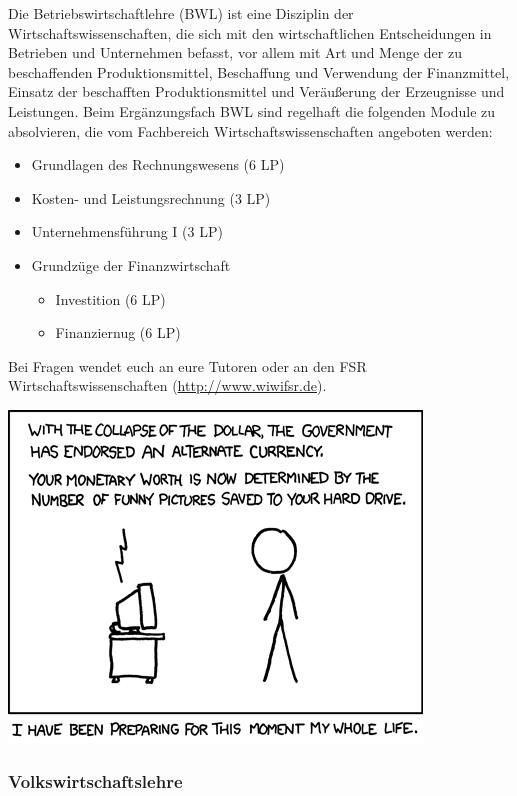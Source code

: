 Die Betriebswirtschaftlehre (BWL) ist eine Disziplin der
Wirtschaftswissenschaften, die sich mit den wirtschaftlichen Entscheidungen in
Betrieben und Unternehmen befasst, vor allem mit Art und Menge der zu
beschaffenden Produktionsmittel, Beschaffung und Verwendung der Finanzmittel,
Einsatz der beschafften Produktionsmittel und Veräußerung der Erzeugnisse und
Leistungen. Beim Ergänzungsfach BWL sind regelhaft die folgenden Module zu
absolvieren, die vom Fachbereich Wirtschaftswissenschaften angeboten werden:

\begin{itemize}\itemsep 0pt
    \item Grundlagen des Rechnungswesens (6 LP)
    \item Kosten- und Leistungsrechnung (3 LP)
    \item Unternehmensführung I (3 LP)
    \item Grundzüge der Finanzwirtschaft
          \begin{itemize}\itemsep 0pt
              \item Investition (6 LP)
              \item Finanziernug (6 LP)
          \end{itemize}
\end{itemize}

Bei Fragen wendet euch an eure Tutoren oder an den FSR
Wirtschaftswissenschaften (\url{http://www.wiwifsr.de}).

\begin{center}
\includegraphics[scale=.675]{comics/512}
\end{center}

\subsubsection{Volkswirtschaftslehre}

